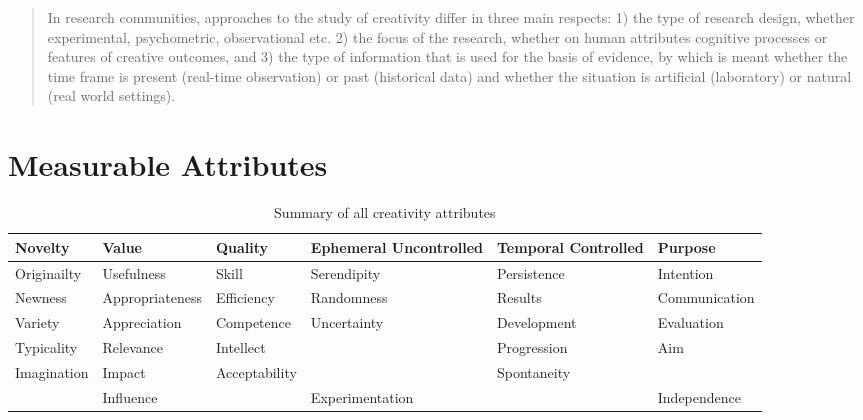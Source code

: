 \begin{quote}
  In research communities, approaches to the study of creativity differ in three main respects: 1) the type of research design, whether experimental, psychometric, observational etc. 2) the focus of the research, whether on human attributes cognitive processes or features of creative outcomes, and 3) the type of information that is used for the basis of evidence, by which is meant whether the time frame is present (real-time observation) or past (historical data) and whether the situation is artificial (laboratory) or natural (real world settings). \citep[p.3]{Candy2012}%
\end{quote}

\begin{comment}
  distinguishing between person’s and product’s creativity \citep[p.258]{Piffer2012}
  it is concluded that a person’s creativity can only be assessed indirectly (for example with self report questionnaires or official external recognition) but it cannot be measured \citep[p.258]{Piffer2012}
\end{comment}


\section{Measurable Attributes}

\begin{table}[htb]
  \begin{tabu}{XXXXXX}
  \toprule
  \textbf{Novelty}
  &
  \textbf{Value}
  &
  \textbf{Quality}
  &
  \textbf{Ephemeral Uncontrolled}
  &
  \textbf{Temporal Controlled}
  &
  \textbf{Purpose}
  \\ \midrule
  Originailty
  &
  Usefulness
  &
  Skill
  &
  Serendipity
  &
  Persistence
  &
  Intention
  \\ \midrule
  Newness
  &
  Appropriateness
  &
  Efficiency
  &
  Randomness
  &
  Results
  &
  Communication
  \\ \midrule
  Variety
  &
  Appreciation
  &
  Competence
  &
  Uncertainty
  &
  Development
  &
  Evaluation
  \\ \midrule
  Typicality
  &
  Relevance
  &
  Intellect
  &
  &
  Progression
  &
  Aim
  \\ \midrule
  Imagination
  &
  Impact
  &
  Acceptability
  &
  &
  Spontaneity
  &
  \\ \midrule
  &
  Influence
  &
  &
  Experimentation
  &
  &
  Independence
  \\
  \bottomrule
  \end{tabu}
\caption[Creativity attributes]{Summary of all creativity attributes}
\label{creatt}
\end{table}

